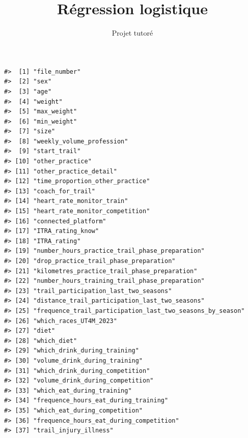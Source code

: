 \documentclass[
]{article}
\title{\Huge{Régression logistique}}
\author{\Large{Projet tutoré}}
\author{}
\date{\vspace{-2.5em}}
\begin{document}
\newpage
\tableofcontents
\newpage

\begin{verbatim}
#>  [1] "file_number"                                             
#>  [2] "sex"                                                     
#>  [3] "age"                                                     
#>  [4] "weight"                                                  
#>  [5] "max_weight"                                              
#>  [6] "min_weight"                                              
#>  [7] "size"                                                    
#>  [8] "weekly_volume_profession"                                
#>  [9] "start_trail"                                             
#> [10] "other_practice"                                          
#> [11] "other_practice_detail"                                   
#> [12] "time_proportion_other_practice"                          
#> [13] "coach_for_trail"                                         
#> [14] "heart_rate_monitor_train"                                
#> [15] "heart_rate_monitor_competition"                          
#> [16] "connected_platform"                                      
#> [17] "ITRA_rating_know"                                        
#> [18] "ITRA_rating"                                             
#> [19] "number_hours_practice_trail_phase_preparation"           
#> [20] "drop_practice_trail_phase_preparation"                   
#> [21] "kilometres_practice_trail_phase_preparation"             
#> [22] "number_hours_training_trail_phase_preparation"           
#> [23] "trail_participation_last_two_seasons"                    
#> [24] "distance_trail_participation_last_two_seasons"           
#> [25] "frequence_trail_participation_last_two_seasons_by_season"
#> [26] "which_races_UT4M_2023"                                   
#> [27] "diet"                                                    
#> [28] "which_diet"                                              
#> [29] "which_drink_during_training"                             
#> [30] "volume_drink_during_training"                            
#> [31] "which_drink_during_competition"                          
#> [32] "volume_drink_during_competition"                         
#> [33] "which_eat_during_training"                               
#> [34] "frequence_hours_eat_during_training"                     
#> [35] "which_eat_during_competition"                            
#> [36] "frequence_hours_eat_during_competition"                  
#> [37] "trail_injury_illness"                                    

\end{verbatim}
\end{document}
